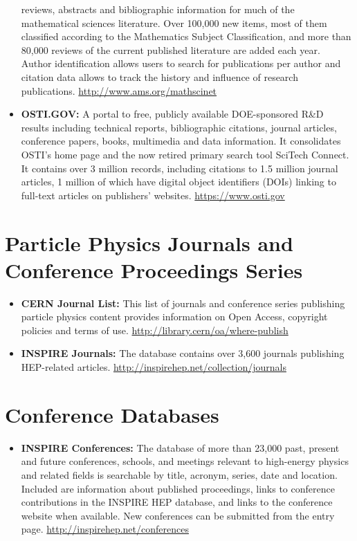 \begin{itemize}
  reviews, abstracts and bibliographic information for much of the
  mathematical sciences literature. Over 100,000 new items, most of them
  classified according to the Mathematics Subject Classification, and
  more than 80,000 reviews of the current published literature are added
  each year. Author identification allows users to search for
  publications per author and citation data allows to track the history
  and influence of research publications.
  \url{http://www.ams.org/mathscinet}
\item
  \textbf{OSTI.GOV:} A portal to free, publicly available DOE-sponsored
  R\&D results including technical reports, bibliographic citations,
  journal articles, conference papers, books, multimedia and data
  information. It consolidates OSTI's home page and the now retired
  primary search tool SciTech Connect. It contains over 3 million
  records, including citations to 1.5 million journal articles, 1
  million of which have digital object identifiers (DOIs) linking to
  full-text articles on publishers' websites. \url{https://www.osti.gov}
\end{itemize}

\section{Particle Physics Journals and Conference Proceedings
Series}\label{particle-physics-journals-and-conference-proceedings-series}

\begin{itemize}
\item
  \textbf{CERN Journal List:} This list of journals and conference
  series publishing particle physics content provides information on
  Open Access, copyright policies and terms of use.
  \url{http://library.cern/oa/where-publish}
\item
  \textbf{INSPIRE Journals:} The database contains over 3,600 journals
  publishing HEP-related articles.
  \url{http://inspirehep.net/collection/journals}
\end{itemize}

\section{Conference Databases}\label{conference-databases}

\begin{itemize}
\tightlist
\item
  \textbf{INSPIRE Conferences:} The database of more than 23,000 past,
  present and future conferences, schools, and meetings relevant to
  high-energy physics and related fields is searchable by title,
  acronym, series, date and location. Included are information about
  published proceedings, links to conference contributions in the
  INSPIRE HEP database, and links to the conference website when
  available. New conferences can be submitted from the entry page.
  \url{http://inspirehep.net/conferences}
\end{itemize}

